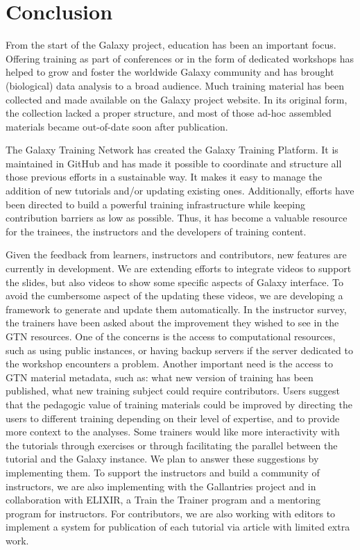 \documentclass[10pt,letterpaper]{article}
\begin{document}
\section*{Conclusion}

From the start of the Galaxy project, education has been an important focus. Offering training as part of conferences or in the form of dedicated workshops has helped to grow and foster the worldwide Galaxy community and has brought (biological) data analysis to a broad audience. Much training material has been collected and made available on the Galaxy project website. In its original form, the collection lacked a proper structure, and most of those ad-hoc assembled materials became out-of-date soon after publication.

The Galaxy Training Network has created the Galaxy Training Platform. It is maintained in GitHub and has made it possible to coordinate and structure all those previous efforts in a sustainable way. It makes it easy to manage the addition of new tutorials and/or updating existing ones. Additionally, efforts have been directed to build a powerful training infrastructure while keeping contribution barriers as low as possible. Thus, it has become a valuable resource for the trainees, the instructors and the developers of training content.

Given the feedback from learners, instructors and contributors, new features are currently in development. We are extending efforts to integrate videos to support the slides, but also videos to show some specific aspects of Galaxy interface. To avoid the cumbersome aspect of the updating these videos, we are developing a framework to generate and update them automatically.
In the instructor survey, the trainers have been asked about the improvement they wished to see in the GTN resources. One of the concerns is the access to computational resources, such as using public instances, or having backup servers if the server dedicated to the workshop encounters a problem.
Another important need is the access to GTN material metadata, such as: what new version of training has been published, what new training subject could require contributors. Users suggest that the pedagogic value of training materials could be improved by directing the users to different training depending on their level of expertise, and to provide more context to the analyses.
Some trainers would like more interactivity with the tutorials through exercises or through facilitating the parallel between the tutorial and the Galaxy instance. We plan to answer these suggestions by implementing them. 
To support the instructors and build a community of instructors, we are also implementing with the Gallantries project and in collaboration with ELIXIR, a Train the Trainer program and a mentoring program for instructors. For contributors, we are also working with editors to implement a system for publication of each tutorial via article with limited extra work.
\end{document}
